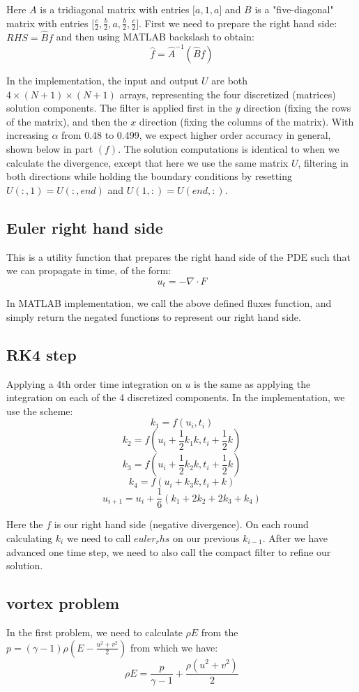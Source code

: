 \documentclass[12pt]{article}
\newcommand{\ga}{\gamma}
\begin{document}
Here $A$ is a tridiagonal matrix with entries $\big[ a, 1, a\big]$ and $B$ is a "five-diagonal" matrix with entries $\big[ \frac{c}{2},\frac{b}{2},a,\frac{b}{2},\frac{c}{2}\big]$. First we need to prepare the right hand side: $RHS = \hat{B}f$ and then using MATLAB backslash to obtain:
$$
	\hat{f} = \hat{A}^{-1}(\hat{B}f)
$$

In the implementation, the input and output $U$ are both $4 \times (N+1) \times (N+1)$ arrays, representing the four discretized (matrices) solution components. The filter is applied first in the $y$ direction (fixing the rows of the matrix), and then the $x$ direction (fixing the columns of the matrix). With increasing $\alpha$ from 0.48 to 0.499, we expect higher order accuracy in general, shown below in part $(f)$. The solution computations is identical to when we calculate the divergence, except that here we use the same matrix $U$, filtering in both directions while holding the boundary conditions by resetting $U(:,1)=U(:,end)$ and $U(1,:)=U(end,:)$.

\subsection{Euler right hand side}
This is a utility function that prepares the right hand side of the PDE such that we can propagate in time, of the form:
$$
	u_t = -\nabla \cdot F
$$

In MATLAB implementation, we call the above defined fluxes function, and simply return the negated functions to represent our right hand side.

\subsection{RK4 step}
Applying a 4th order time integration on $u$ is the same as applying the integration on each of the 4 discretized components. In the implementation, we use the scheme:
$$
	k_1 = f(u_{i},t_i)
$$
$$
	k_2 = f(u_i + \frac12 k_1 k, t_i + \frac12 k)
$$
$$
	k_3 = f(u_i + \frac12 k_2 k, t_i + \frac12 k)
$$
$$
	k_4 = f(u_i + k_3k, t_i + k)
$$
$$
	u_{i+1} = u_{i} + \frac{1}{6}(k_1 + 2k_2 + 2k_3 + k_4)
$$

Here the $f$ is our right hand side (negative divergence). On each round calculating $k_i$ we need to call $euler_rhs$ on our previous $k_{i-1}$. After we have advanced one time step, we need to also call the compact filter to refine our solution.

\subsection{vortex problem}
In the first problem, we need to calculate $\rho E$ from the $p= (\ga-1)\rho(E - \frac{u^2+v^2}{2})$ from which we have:
$$
	\rho E = \frac{p}{\ga-1} + \frac{\rho(u^2+v^2)}{2}
$$
\end{document}
